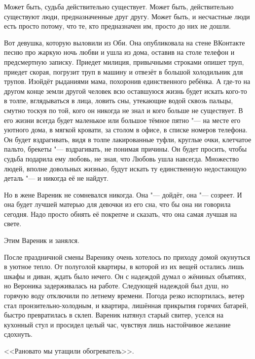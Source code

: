 \asterism

Может быть, судьба действительно существует.
Может быть, действительно существуют люди, предназначенные друг другу.
Может быть, и несчастные люди есть просто потому, что те, кто предназначен им, просто до них не дошли.

Вот девушка, которую выловили из Оби.
Она опубликовала на стене ВКонтакте песню про жаркую ночь любви и ушла из дома, оставив на столе телефон и предсмертную записку.
Приедет милиция, привычными строками опишет труп, приедет скорая, погрузит труп в машину и отвезёт в большой холодильник для трупов.
Изойдёт рыданиями мама, похоронив единственного ребёнка.
А где-то на другом конце земли другой человек всю оставшуюся жизнь будет искать кого-то в толпе, вглядываться в лица, ловить сны, утекающие водой сквозь пальцы, смутно тоскуя по той, кого он никогда не знал и кого больше не существует.
В его жизни всегда будет маленькое или большое тёмное пятно "--- на месте его уютного дома, в мягкой кровати, за столом в офисе, в списке номеров телефона.
Он будет вздрагивать, видя в толпе лакированные туфли, круглые очки, клетчатое пальто, брекеты "--- вздрагивать, не понимая причины.
Он будет просить, чтобы судьба подарила ему любовь, не зная, что Любовь ушла навсегда.
Множество людей, вполне довольных жизнью, будут искать ту единственную недостающую деталь "--- и никогда её не найдут.

Но в жене Вареник не сомневался никогда.
Она "--- дойдёт, она "--- созреет.
И она будет лучшей матерью для девочки из его сна, что бы она ни говорила сегодня.
Надо просто обнять её покрепче и сказать, что она самая лучшая на свете.

Этим Вареник и занялся.

\asterism

\textspace

\label{Sun_2012_06_10}

После праздничной смены Варенику очень хотелось по приходу домой окунуться в уютное тепло.
От полуголой квартиры, в которой из их вещей остались лишь шкафы и диван, ждать было нечего.
Он с надеждой думал о жёниных объятиях, но Вероника задерживалась на работе.
Следующей надеждой был душ, но горячую воду отключили по летнему времени.
Погода резко испортилась, ветер стал пронзительно-холодным, и квартира, лишённая прикрытия горячих батарей, быстро превратилась в склеп.
Вареник натянул старый свитер, уселся на кухонный стул и просидел целый час, чувствуя лишь настойчивое желание сдохнуть.

<<Рановато мы утащили обогреватель>>.

